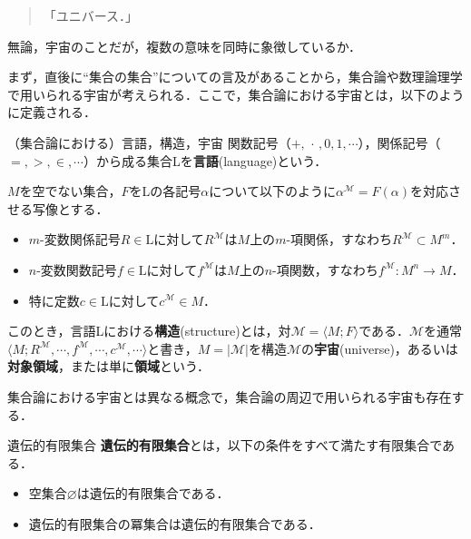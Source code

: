 \documentclass[10pt, a5paper, twoside]{ltjsarticle}
\begin{document}
            \begin{quote}
                「ユニバース．」
            \end{quote}

            無論，宇宙のことだが，複数の意味を同時に象徴しているか．

            まず，直後に“集合の集合”についての言及があることから，集合論や数理論理学で用いられる宇宙が考えられる．ここで，集合論における宇宙とは，以下のように定義される\cite{arai,tanakak}．

            \begin{dfn}{（集合論における）言語，構造，宇宙}{}
                関数記号（$+, \,\cdot\,, 0, 1, \cdots$），関係記号（$=, >, \in, \cdots$）から成る集合Lを\textbf{言語}(language)という．

                $M$を空でない集合，$F$をLの各記号$\alpha$について以下のように$\alpha^\mathcal{M} = F(\alpha)$を対応させる写像とする．

                \begin{itemize}
                    \item $m$-変数関係記号$R \in \textrm{L}$に対して$R^\mathcal{M}$は$M$上の$m$-項関係，すなわち$R^\mathcal{M} \subset M^m$．
                    \item $n$-変数関数記号$f \in \textrm{L}$に対して$f^\mathcal{M}$は$M$上の$n$-項関数，すなわち$f^\mathcal{M} : M^n \to M$．
                    \item 特に定数$c \in \textrm{L}$に対して$c^\mathcal{M} \in M$．
                \end{itemize}

                このとき，言語Lにおける\textbf{構造}(structure)とは，対$\mathcal{M} = \langle M ; F \rangle$である．$\mathcal{M}$を通常$\langle M ; R^\mathcal{M}, \cdots, f^\mathcal{M}, \cdots, c^\mathcal{M}, \cdots \rangle$と書き，$M = |\mathcal{M}|$を構造$\mathcal{M}$の\textbf{宇宙}(universe)，あるいは\textbf{対象領域}，または単に\textbf{領域}という．
            \end{dfn}

            集合論における宇宙とは異なる概念で，集合論の周辺で用いられる宇宙も存在する．

            \begin{dfn}{遺伝的有限集合}{}
                \textbf{遺伝的有限集合}とは，以下の条件をすべて満たす有限集合である．

                \begin{itemize}
                    \item 空集合$\varnothing$は遺伝的有限集合である．
                    \item 遺伝的有限集合の冪集合は遺伝的有限集合である．
                \end{itemize}
            \end{dfn}
\end{document}
